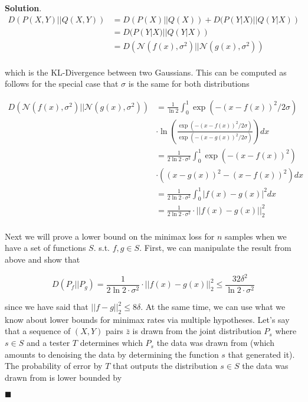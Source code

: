 \documentclass[12pt]{article}
\theoremstyle{definition}
\newenvironment{s}{%
        \begin{trivlist} \item \textbf{Solution}. }{%
            \hspace*{\fill} $\blacksquare$\end{trivlist}}%
\begin{document}
{\begin{s}
\begin{align*}
D(P(X,Y)||Q(X,Y)) &= D(P(X)||Q(X)) + D(P(Y|X)||Q(Y|X))\\
&= D(P(Y|X)||Q(Y|X))\\
&= D(\mathcal{N}(f(x),\sigma^{2})||\mathcal{N}(g(x),\sigma^{2}))\\
\end{align*}

which is the KL-Divergence between two Gaussians. This can be computed as follows for the special case that $\sigma$ is the same for both distributions

\begin{align*}
D(\mathcal{N}(f(x),\sigma^{2})||\mathcal{N}(g(x),\sigma^{2})) &= 
\frac{1}{\ln 2}\int_{0}^{1} \exp\left(-(x-f(x))^{2}/2\sigma\right)\\ &\cdot \ln \left(\frac{\exp\left(-(x-f(x))^{2}/2\sigma\right)}{\exp\left(-(x-g(x))^{2}/2\sigma\right)}\right)dx\\
&= \frac{1}{2\ln 2\cdot \sigma^{2}}\int_{0}^{1} \exp\left(-(x-f(x))^{2}\right)\\ &\cdot \left((x-g(x))^{2}-(x-f(x))^{2}\right)dx\\
&= \frac{1}{2\ln 2\cdot \sigma^{2}}\int_{0}^{1} |f(x)-g(x)|^{2}dx\\
&= \frac{1}{2\ln 2\cdot \sigma^{2}}\cdot ||f(x)-g(x)||_{2}^{2}\\
\end{align*}

Next we will prove a lower bound on the minimax loss for $n$ samples when we have a set of functions $S$. s.t. $f,g \in S$. First, we can manipulate the result from above and show that

\begin{equation*}
D(P_{f}||P_{g}) = \frac{1}{2\ln 2\cdot \sigma^{2}}\cdot ||f(x)-g(x)||_{2}^{2} \leq \frac{32\delta^{2}}{\ln 2\cdot \sigma^{2}}
\end{equation*}

since we have said that $||f-g||_{2}^{2} \leq 8\delta$. At the same time, we can use what we know about lower bounds for minimax rates via multiple hypotheses. Let's say that a sequence of $(X,Y)$ pairs $\bar{z}$ is drawn from the joint distribution $P_{s}$ where $s \in S$ and a tester $T$ determines which $P_{s}$ the data was drawn from (which amounts to denoising the data by determining the function $s$ that generated it). The probability of error by $T$ that outputs the distribution $s\in S$ the data was drawn from is lower bounded by


\end{s}}
\end{document}
